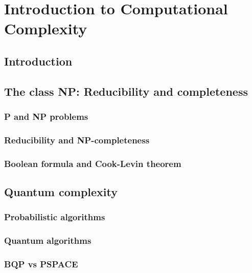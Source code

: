 \chapter{Introduction to Computational Complexity}

\section{Introduction}

\section{The class NP: Reducibility and completeness}
\subsection{P and NP problems}
\subsection{Reducibility and NP-completeness}
\subsection{Boolean formula and Cook-Levin theorem}

\section{Quantum complexity}
\subsection{Probabilistic algorithms}
\subsection{Quantum algorithms}
\subsection{BQP vs PSPACE}